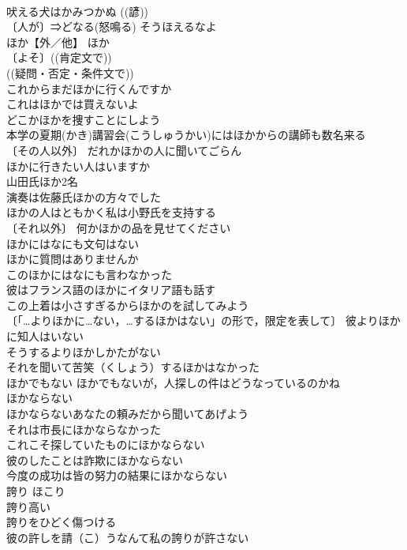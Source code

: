\documentclass[8pt]{extreport}
\begin{document}
\begin{CJK}{UTF8}{min}
\\	吠える犬はかみつかぬ ((諺)) 
\\	〔人が〕⇒どなる(怒鳴る) そうほえるなよ 
\\	ほか【外／他】	ほか	
\\	〔よそ〕((肯定文で)) 
\\	((疑問・否定・条件文で)) 
\\	これからまだほかに行くんですか 
\\	これはほかでは買えないよ 
\\	どこかほかを捜すことにしよう 
\\	本学の夏期(かき)講習会(こうしゅうかい)にはほかからの講師も数名来る 
\\	〔その人以外〕 だれかほかの人に聞いてごらん 
\\	ほかに行きたい人はいますか 
\\	山田氏ほか2名 
\\	演奏は佐藤氏ほかの方々でした 
\\	ほかの人はともかく私は小野氏を支持する 
\\	〔それ以外〕 何かほかの品を見せてください 
\\	ほかにはなにも文句はない 
\\	ほかに質問はありませんか 
\\	このほかにはなにも言わなかった 
\\	彼はフランス語のほかにイタリア語も話す 
\\	この上着は小さすぎるからほかのを試してみよう 
\\	〔「…よりほかに…ない，…するほかはない」の形で，限定を表して〕 彼よりほかに知人はいない 
\\	そうするよりほかしかたがない 
\\	それを聞いて苦笑（くしょう）するほかはなかった 
\\	ほかでもない ほかでもないが，人探しの件はどうなっているのかね 
\\	ほかならない　
\\	ほかならないあなたの頼みだから聞いてあげよう 
\\	それは市長にほかならなかった 
\\	これこそ探していたものにほかならない 
\\	彼のしたことは詐欺にほかならない 
\\	今度の成功は皆の努力の結果にほかならない 
\\	誇り	ほこり	
\\	誇り高い 
\\	誇りをひどく傷つける 
\\	彼の許しを請（こ）うなんて私の誇りが許さない 

\end{CJK}
\end{document}
